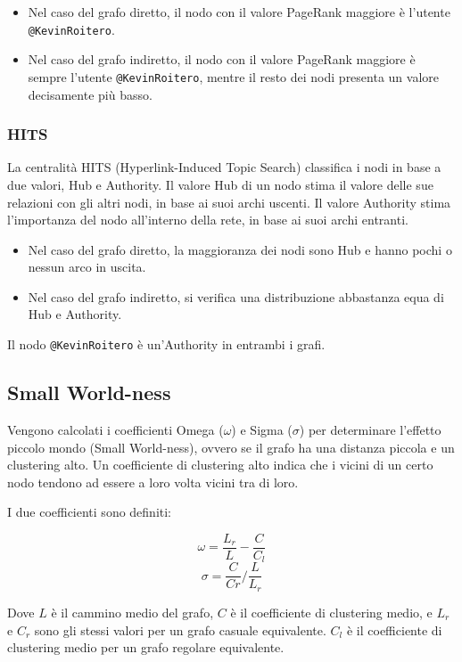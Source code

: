 \documentclass[a4paper, 11pt, twoside]{article}
\begin{document}
\begin{itemize}
    \item Nel caso del grafo diretto, il nodo con il valore PageRank maggiore è l'utente \texttt{@KevinRoitero}.
    \item Nel caso del grafo indiretto, il nodo con il valore PageRank maggiore è sempre l'utente \texttt{@KevinRoitero}, mentre il resto dei nodi presenta un valore decisamente più basso.
\end{itemize}

\subsubsection{HITS}
La centralità HITS (Hyperlink-Induced Topic Search) classifica i nodi in base a due valori, Hub e Authority. Il valore Hub di un nodo stima il valore delle sue relazioni con gli altri nodi, in base ai suoi archi uscenti. Il valore Authority stima l'importanza del nodo all'interno della rete, in base ai suoi archi entranti.

\begin{itemize}
    \item Nel caso del grafo diretto, la maggioranza dei nodi sono Hub e hanno pochi o nessun arco in uscita.
    \item Nel caso del grafo indiretto, si verifica una distribuzione abbastanza equa di Hub e Authority.
\end{itemize}
Il nodo \texttt{@KevinRoitero} è un'Authority in entrambi i grafi.

\subsection{Small World-ness}
Vengono calcolati i coefficienti Omega ($\omega$) e Sigma ($\sigma$) per determinare l'effetto piccolo mondo (Small World-ness), ovvero se il grafo ha una distanza piccola e un clustering alto. Un coefficiente di clustering alto indica che i vicini di un certo nodo tendono ad essere a loro volta vicini tra di loro.

I due coefficienti sono definiti:

$$
    \omega = \frac{L_r}{L} - \frac{C}{C_l}
$$
$$
    \sigma = \frac{C}{Cr} / \frac{L}{L_r}
$$

Dove $L$ è il cammino medio del grafo, $C$ è il coefficiente di clustering medio, e $L_r$ e $C_r$ sono gli stessi valori per un grafo casuale equivalente. $C_l$ è il coefficiente di clustering medio per un grafo regolare equivalente.
\end{document}
